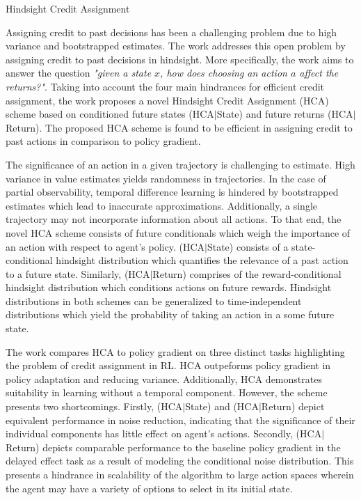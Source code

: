 \documentclass[11pt,letterpaper]{article}
\begin{document}
\begin{center}
  \large{Hindsight Credit Assignment}
\end{center}

Assigning credit to past decisions has been a challenging problem due to high variance and bootstrapped estimates. The work addresses this open problem by assigning credit to past decisions in hindsight. More specifically, the work aims to answer the question \textit{"given a state $x$, how does choosing an action $a$ affect the returns?"}. Taking into account the four main hindrances for efficient credit assignment, the work proposes a novel Hindsight Credit Assignment (HCA) scheme based on conditioned future states (HCA$|$State) and future returns (HCA$|$Return). The proposed HCA scheme is found to be efficient in assigning credit to past actions in comparison to policy gradient.

The significance of an action in a given trajectory is challenging to estimate. High variance in value estimates yields randomness in trajectories. In the case of partial observability, temporal difference learning is hindered by bootstrapped estimates which lead to inaccurate approximations. Additionally, a single trajectory may not incorporate information about all actions. To that end, the novel HCA scheme consists of future conditionals which weigh the importance of an action with respect to agent's policy. (HCA$|$State) consists of a state-conditional hindsight distribution which quantifies the relevance of a past action to a future state. Similarly, (HCA$|$Return) comprises of the reward-conditional hindsight distribution which conditions actions on future rewards. Hindsight distributions in both schemes can be generalized to time-independent distributions which yield the probability of taking an action in a some future state. 

The work compares HCA to policy gradient on three distinct tasks highlighting the problem of credit assignment in RL. HCA outpeforms policy gradient in policy adaptation and reducing variance. Additionally, HCA demonstrates suitability in learning without a temporal component. However, the scheme presents two shortcomings. Firstly, (HCA$|$State) and (HCA$|$Return) depict equivalent performance in noise reduction, indicating that the significance of their individual components has little effect on agent's actions. Secondly, (HCA$|$Return) depicts comparable performance to the baseline policy gradient in the delayed effect task as a result of modeling the conditional noise distribution. This presents a hindrance in scalability of the algorithm to large action spaces wherein the agent may have a variety of options to select in its initial state. 
\end{document}
